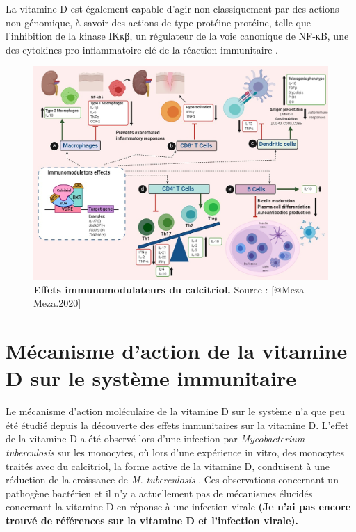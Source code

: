 \documentclass[
  a4paper,
  DIV=11,
  numbers=noendperiod,
  listof=totoc]{scrreprt}
\begin{document}
La vitamine D est également capable d'agir non-classiquement par des
actions non-génomique, à savoir des actions de type protéine-protéine,
telle que l'inhibition de la kinase IKκβ, un régulateur de la voie
canonique de NF-κB, une des cytokines pro-inflammatoire clé de la
réaction immunitaire \autocite{Hii.2016}.

\begin{figure}
\includegraphics{figures/calcitriol-immunomodulatory.jpg} 
\caption[\textbf{Effets immunomodulateurs du calcitriol.}]{\textbf{Effets immunomodulateurs du calcitriol.} Source : [@Meza-Meza.2020]}\label{fig:immunomod}
\end{figure}

\hypertarget{muxe9canisme-daction-de-la-vitamine-d-sur-le-systuxe8me-immunitaire}{%
\section{Mécanisme d'action de la vitamine D sur le système
immunitaire}\label{muxe9canisme-daction-de-la-vitamine-d-sur-le-systuxe8me-immunitaire}}

Le mécanisme d'action moléculaire de la vitamine D sur le système n'a
que peu été étudié depuis la découverte des effets immunitaires sur la
vitamine D. L'effet de la vitamine D a été observé lors d'une infection
par \emph{Mycobacterium tuberculosis} sur les monocytes, où lors d'une
expérience in vitro, des monocytes traités avec du calcitriol, la forme
active de la vitamine D, conduisent à une réduction de la croissance de
\emph{M. tuberculosis} \autocite{Hewison.2011}. Ces observations
concernant un pathogène bactérien et il n'y a actuellement pas de
mécanismes élucidés concernant la vitamine D en réponse à une infection
virale \textbf{(Je n'ai pas encore trouvé de références sur la vitamine
D et l'infection virale).}
\end{document}
